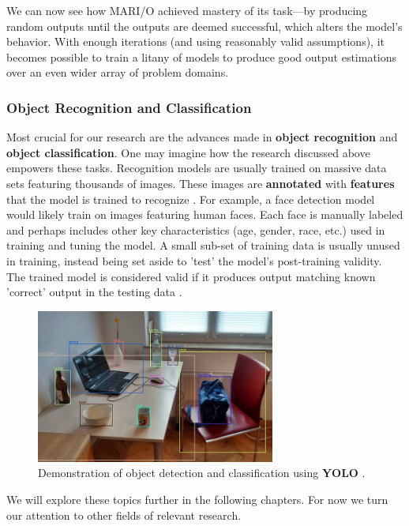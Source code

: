 \documentclass{report}
\newcommand{\tech}[1]{\textbf{#1}}
\begin{document}
We can now see how MARI/O achieved mastery of its task---by producing random outputs until the outputs are deemed successful, which alters the model's behavior. With enough iterations (and using reasonably valid assumptions), it becomes possible to train a litany of models to produce good output estimations over an even wider array of problem domains.  

\subsubsection{Object Recognition and Classification}
Most crucial for our research are the advances made in \tech{object recognition} and \tech{object classification}. One may imagine how the research discussed above empowers these tasks. Recognition models are usually trained on massive data sets featuring thousands of images. These images are \tech{annotated} with \tech{features} that the model is trained to recognize \cite{wang2016deep}. For example, a face detection model would likely train on images featuring human faces. Each face is manually labeled and perhaps includes  other key characteristics (age, gender, race, etc.) used in training and tuning the model. A small sub-set of training data is usually unused in training, instead being set aside to 'test' the model's post-training validity. The trained model is considered valid if it produces output matching known 'correct' output in the testing data \cite{zhao2019objectdetectiondeeplearning}. 


\begin{figure}
    \centering
    \includegraphics[width=0.7\textwidth]{objectdetect.jpg}
    \caption{Demonstration of object detection and classification using \tech{YOLO} \cite{objdetect}.}
    \label{fig:objectdetect}
\end{figure}

We will explore these topics further in the following chapters. For now we turn our attention to other fields of relevant research. 
\end{document}
